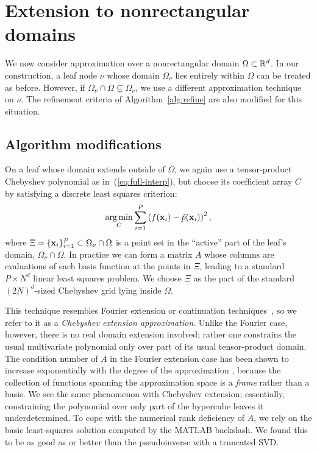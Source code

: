 \section{Extension to nonrectangular domains}
\label{sec:general-domain}

We now consider approximation over a nonrectangular domain $\Omega\subset \mathbb{R}^d$. In our construction, a leaf node $\nu$ whose domain $\Omega_\nu$ lies entirely within $\Omega$ can be treated as before. However, if $\Omega_\nu\cap \Omega \subsetneq \Omega_\nu$, we use a different approximation technique on $\nu$. The refinement criteria of Algorithm~\ref{alg:refine} are also modified for this situation.

\subsection{Algorithm modifications}


On a leaf whose domain extends outside of $\Omega$, we again use a tensor-product Chebyshev polynomial as in~(\ref{eq:full-interp}), but choose its coefficient array $C$ by satisfying a discrete least squares criterion:
\begin{equation}
  \operatorname*{arg\,min}_{C} \sum_{i=1}^{P} \left( f(\mathbf{x}_i) -  \tilde{p}(\mathbf{x}_i) \right)^2,
\end{equation}
where $\Xi = \{\mathbf{x}_i\}_{i=1}^{P} \subset \Omega_\nu\cap \Omega$ is a point set in the ``active'' part of the leaf's domain, $\Omega_\nu\cap \Omega$. In practice we can form a matrix $A$ whose columns are evaluations of each basis function at the points in $\Xi$, leading to a standard $P\times N^d$ linear least squares problem. We choose $\Xi$ as the part of the standard $(2N)^d$-sized Chebyshev grid lying inside $\Omega$. 

This technique resembles Fourier extension or continuation techniques~\cite{adcock2014resolution,huybrechs2010fourier}, so we refer to it as a \emph{Chebyshev extension approximation}. Unlike the Fourier case, however, there is no real domain extension involved; rather one constrains the usual multivariate polynomial only over part of its usual tensor-product domain. The condition number of $A$ in the Fourier extension case has been shown to increase exponentially with the degree of the approximation \cite{adcock2014numerical}, because the collection of functions spanning the approximation space is a \emph{frame} rather than a basis. We see the same phenomenon with Chebyshev extension; essentially, constraining the polynomial over only part of the hypercube leaves it underdetermined. To cope with the numerical rank deficiency of $A$, we rely on the basic least-squares solution computed by the MATLAB backslash. We found this to be as good as or better than the pseudoinverse with a truncated SVD. 

